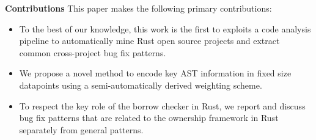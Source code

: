 \noindent \textbf{Contributions} This paper makes the following primary contributions:

\begin{itemize}
    \item To the best of our knowledge, this work is the first to exploits a code analysis pipeline to automatically mine Rust open source projects and extract common cross-project bug fix patterns.
    \item We propose a novel method to encode key AST information in fixed size datapoints using a semi-automatically derived weighting scheme.
    \item To respect the key role of the borrow checker in Rust, we report and discuss bug fix patterns that are related to the ownership framework in Rust separately from general patterns.
\end{itemize}


